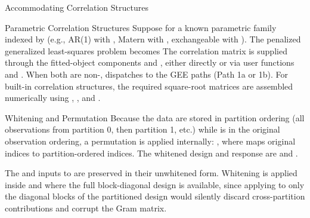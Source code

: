 \begin{Section}{Accommodating Correlation Structures}


%
\begin{SubSection}{Parametric Correlation Structures}
Suppose 
for a known parametric family indexed by \eqn{\boldsymbol{\theta}}{} (e.g.,
AR(1) with \eqn{\theta = \rho}{}, Matern with
\eqn{\boldsymbol{\theta} = (\ell, \nu)}{}, exchangeable with
\eqn{\theta = \rho}{}). The penalized generalized least-squares problem
becomes
The correlation matrix  is supplied through the
fitted-object components  and , either
directly or via user functions  and .
When both are non-,  dispatches to the GEE
paths (Path 1a or 1b). For built-in correlation structures, the required
square-root matrices are assembled numerically using
, , and .
\end{SubSection}


%
\begin{SubSection}{Whitening and Permutation}
Because the data are stored in partition ordering (all observations from
partition 0, then partition 1, etc.) while  is in the
original observation ordering, a permutation is applied internally:
, where
 maps original
indices to partition-ordered indices. The whitened design and response are
 and
.

The  and  inputs to
 are preserved in their unwhitened form.
Whitening is applied inside  and
 where the full 
block-diagonal design is available, since applying
 to only the diagonal blocks of the partitioned
design would silently discard cross-partition contributions and corrupt
the Gram matrix.
\end{SubSection}



\end{Section}
